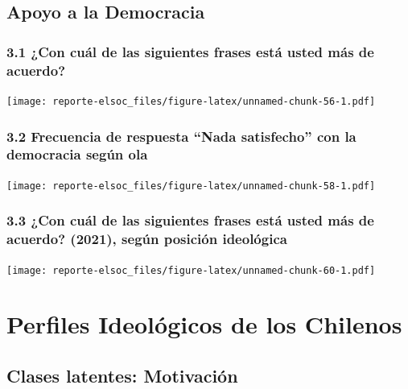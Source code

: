 \documentclass[
  12pt,
  openany]{book}
\begin{document}
\hypertarget{apoyo-a-la-democracia}{%
\section{Apoyo a la Democracia}\label{apoyo-a-la-democracia}}

\hypertarget{con-cuuxe1l-de-las-siguientes-frases-estuxe1-usted-muxe1s-de-acuerdo}{%
\subsection{3.1 ¿Con cuál de las siguientes frases está usted más de acuerdo?}\label{con-cuuxe1l-de-las-siguientes-frases-estuxe1-usted-muxe1s-de-acuerdo}}

\texttt{[image: reporte-elsoc\_files/figure-latex/unnamed-chunk-56-1.pdf]}

\hypertarget{frecuencia-de-respuesta-nada-satisfecho-con-la-democracia-seguxfan-ola}{%
\subsection{3.2 Frecuencia de respuesta ``Nada satisfecho'' con la democracia según ola}\label{frecuencia-de-respuesta-nada-satisfecho-con-la-democracia-seguxfan-ola}}

\texttt{[image: reporte-elsoc\_files/figure-latex/unnamed-chunk-58-1.pdf]}

\hypertarget{con-cuuxe1l-de-las-siguientes-frases-estuxe1-usted-muxe1s-de-acuerdo-2021-seguxfan-posiciuxf3n-ideoluxf3gica}{%
\subsection{3.3 ¿Con cuál de las siguientes frases está usted más de acuerdo? (2021), según posición ideológica}\label{con-cuuxe1l-de-las-siguientes-frases-estuxe1-usted-muxe1s-de-acuerdo-2021-seguxfan-posiciuxf3n-ideoluxf3gica}}

\texttt{[image: reporte-elsoc\_files/figure-latex/unnamed-chunk-60-1.pdf]}

\hypertarget{perfiles-ideoluxf3gicos-de-los-chilenos}{%
\chapter{Perfiles Ideológicos de los Chilenos}\label{perfiles-ideoluxf3gicos-de-los-chilenos}}

\hypertarget{clases-latentes-motivaciuxf3n}{%
\section{Clases latentes: Motivación}\label{clases-latentes-motivaciuxf3n}}
\end{document}
